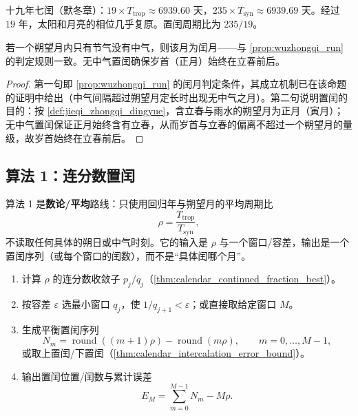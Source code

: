 \begin{definition}[置闰——两套系统的相位对齐]\label{def:intercalation}
十九年七闰（默冬章）：\(19\times T_{\text{trop}}\approx 6939.60\) 天，\(235\times T_{\text{syn}}\approx 6939.69\) 天。经过 \(19\) 年，太阳和月亮的相位几乎复原。置闰周期比为 \(235/19\)。
\end{definition}

\begin{proposition}\label{prop:wuzhongqi_rule}
若一个朔望月内只有节气没有中气，则该月为闰月——与 \cref{prop:wuzhongqi_run} 的判定规则一致。无中气置闰确保岁首（正月）始终在立春前后。
\end{proposition}

\begin{proof}
第一句即 \cref{prop:wuzhongqi_run} 的闰月判定条件，其成立机制已在该命题的证明中给出（中气间隔超过朔望月定长时出现无中气之月）。第二句说明置闰的目的：按 \cref{def:jieqi_zhongqi_dingyue}，含立春与雨水的朔望月为正月（寅月）；无中气置闰保证正月始终含有立春，从而岁首与立春的偏离不超过一个朔望月的量级，故岁首始终在立春前后。
\end{proof}

\subsection{算法 1：连分数置闰}
\label{subsec:continued_fraction_intercalation_algorithm}

算法 1 是\textbf{数论/平均}路线：只使用回归年与朔望月的平均周期比
\[
\rho=\frac{T_{\text{trop}}}{T_{\text{syn}}},
\]
不读取任何具体的朔日或中气时刻。它的输入是 \(\rho\) 与一个窗口/容差，输出是一个置闰序列（或每个窗口的闰数），而不是“具体闰哪个月”。

\begin{enumerate}[label=\textbf{步骤 \arabic*.}, leftmargin=*]
    \item 计算 \(\rho\) 的连分数收敛子 \(p_j/q_j\)（\cref{thm:calendar_continued_fraction_best}）。
    \item 按容差 \(\varepsilon\) 选最小窗口 \(q_j\)，使 \(1/q_{j+1}<\varepsilon\)；或直接取给定窗口 \(M\)。
    \item 生成平衡置闰序列
    \[
    N_m=\operatorname{round}((m+1)\rho)-\operatorname{round}(m\rho),
    \qquad m=0,\dots,M-1,
    \]
    或取上置闰/下置闰（\cref{thm:calendar_intercalation_error_bound}）。
    \item 输出置闰位置/闰数与累计误差
    \[
    E_M=\sum_{m=0}^{M-1}N_m-M\rho.
    \]
\end{enumerate}

